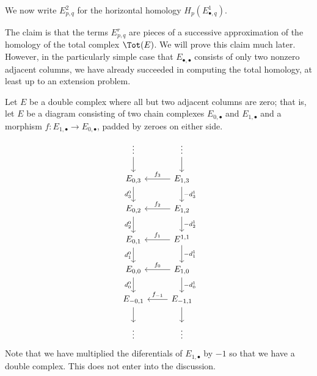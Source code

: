 \documentclass[main.tex]{subfiles}
\begin{document}
We now write $E^{2}_{p,q}$ for the horizontal homology $H_{p}(E^{1}_{\bullet, q})$.

The claim is that the terms $E^{r}_{p,q}$ are pieces of a successive approximation of the homology of the total complex $\Tot(E)$. We will prove this claim much later. However, in the particularly simple case that $E_{\bullet,\bullet}$ consists of only two nonzero adjacent columns, we have already succeeded in computing the total homology, at least up to an extension problem.
\begin{example}
  \label{eg:cone_spectral_sequence}
  Let $E$ be a double complex where all but two adjacent columns are zero; that is, let $E$ be a diagram consisting of two chain complexes $E_{0,\bullet}$ and $E_{1, \bullet}$ and a morphism $f\colon E_{1, \bullet} \to E_{0, \bullet}$, padded by zeroes on either side.
  \begin{equation*}
    \begin{tikzcd}
      \vdots
      \arrow[d]
      & \vdots
      \arrow[d]
      \\
      E_{0,3}
      \arrow[d, swap, "d^{0}_{3}"]
      & E_{1,3}
      \arrow[l, swap, "f_{3}"]
      \arrow[d, "-d^{1}_{3}"]
      \\
      E_{0,2}
      \arrow[d, swap, "d^{0}_{2}"]
      & E_{1,2}
      \arrow[l, swap, "f_{2}"]
      \arrow[d, "-d^{1}_{2}"]
      \\
      E_{0,1}
      \arrow[d, swap, "d^{0}_{1}"]
      & E^{1,1}
      \arrow[l, swap, "f_{1}"]
      \arrow[d, "-d^{1}_{1}"]
      \\
      E_{0,0}
      \arrow[d, swap, "d^{0}_{0}"]
      & E_{1,0}
      \arrow[d, "-d^{1}_{0}"]
      \arrow[l, swap, "f_{0}"]
      \\
      E_{-0,1}
      \arrow[d]
      & E_{-1,1}
      \arrow[l, swap, "f_{-1}"]
      \arrow[d]
      \\
      \vdots
      & \vdots
    \end{tikzcd}
  \end{equation*}
  Note that we have multiplied the diferentials of $E_{1, \bullet}$ by $-1$ so that we have a double complex. This does not enter into the discussion.


\end{example}
\end{document}
